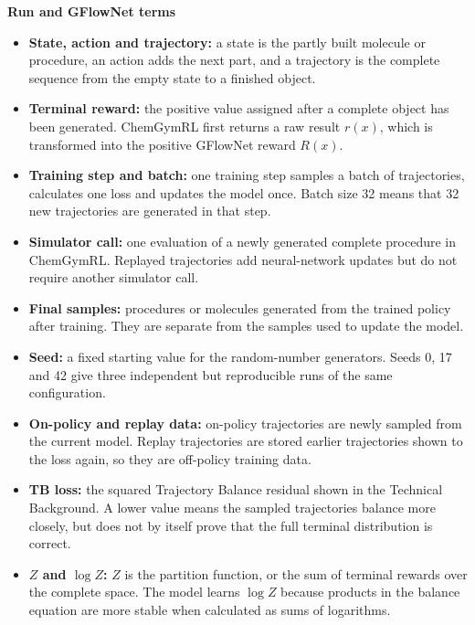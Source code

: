 \documentclass{article}
\begin{document}
\textbf{Run and GFlowNet terms}
\begin{itemize}
    \item \textbf{State, action and trajectory:} a state is the partly built molecule or procedure, an action adds the next part, and a trajectory is the complete sequence from the empty state to a finished object.
    \item \textbf{Terminal reward:} the positive value assigned after a complete object has been generated. ChemGymRL first returns a raw result $r(x)$, which is transformed into the positive GFlowNet reward $R(x)$.
    \item \textbf{Training step and batch:} one training step samples a batch of trajectories, calculates one loss and updates the model once. Batch size 32 means that 32 new trajectories are generated in that step.
    \item \textbf{Simulator call:} one evaluation of a newly generated complete procedure in ChemGymRL. Replayed trajectories add neural-network updates but do not require another simulator call.
    \item \textbf{Final samples:} procedures or molecules generated from the trained policy after training. They are separate from the samples used to update the model.
    \item \textbf{Seed:} a fixed starting value for the random-number generators. Seeds 0, 17 and 42 give three independent but reproducible runs of the same configuration.
    \item \textbf{On-policy and replay data:} on-policy trajectories are newly sampled from the current model. Replay trajectories are stored earlier trajectories shown to the loss again, so they are off-policy training data.
    \item \textbf{TB loss:} the squared Trajectory Balance residual shown in the Technical Background. A lower value means the sampled trajectories balance more closely, but does not by itself prove that the full terminal distribution is correct.
    \item \textbf{$Z$ and $\log Z$:} $Z$ is the partition function, or the sum of terminal rewards over the complete space. The model learns $\log Z$ because products in the balance equation are more stable when calculated as sums of logarithms.
\end{itemize}
\end{document}
